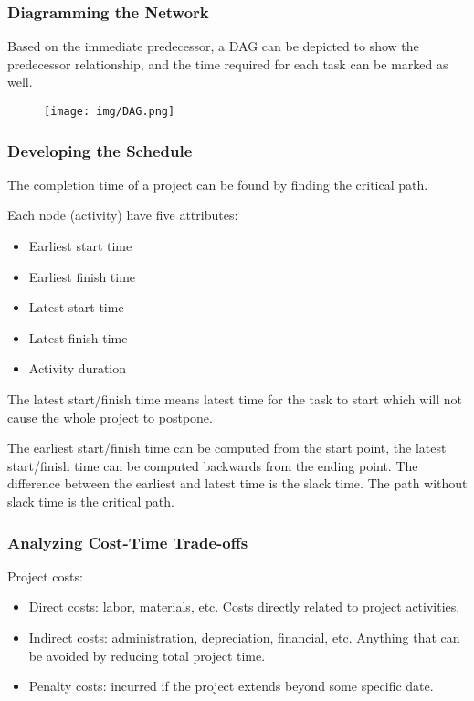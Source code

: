 \documentclass{article}
\begin{document}
\subsubsection{Diagramming the Network}

Based on the immediate predecessor, a DAG can be depicted to show the predecessor relationship,
and the time required for each task can be marked as well.
\begin{figure}[H]
	\centering
	\texttt{[image: img/DAG.png]}
\end{figure}

\subsubsection{Developing the Schedule}

The completion time of a project can be found by finding the critical path.

Each node (activity) have five attributes:
\begin{itemize}
	\item Earliest start time
	\item Earliest finish time
	\item Latest start time
	\item Latest finish time
	\item Activity duration
\end{itemize}

The latest start/finish time means latest time for the task to start which will not cause the whole project to postpone.

The earliest start/finish time can be computed from the start point,
the latest start/finish time can be computed backwards from the ending point.
The difference between the earliest and latest time is the slack time.
The path without slack time is the critical path.

\subsubsection{Analyzing Cost-Time Trade-offs}

Project costs:
\begin{itemize}
	\item Direct costs: labor, materials, etc. Costs directly related to project activities.
	\item Indirect costs: administration, depreciation, financial, etc. Anything that can be avoided by reducing total project time.
	\item Penalty costs: incurred if the project extends beyond some specific date.
\end{itemize}
\end{document}
